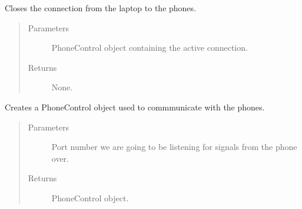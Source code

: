 \documentclass[letterpaper,10pt,english]{sphinxmanual}
\begin{document}
\begin{fulllineitems}
\begin{fulllineitems}
\begin{quote}
\begin{description}
\end{description}\end{quote}

\end{fulllineitems}


\end{fulllineitems}


\begin{fulllineitems}
\label{\detokenize{index:src.Controllers.Program_Controller.close_conn}}
Closes the connection from the laptop to the phones.
\begin{quote}\begin{description}
\item[{Parameters}] \leavevmode
{} \textendash{} PhoneControl object containing the active connection.

\item[{Returns}] \leavevmode
None.

\end{description}\end{quote}

\end{fulllineitems}


\begin{fulllineitems}
\label{\detokenize{index:src.Controllers.Program_Controller.createPhoneConnection}}
Creates a PhoneControl object used to commmunicate with the phones.
\begin{quote}\begin{description}
\item[{Parameters}] \leavevmode
{} \textendash{} Port number we are going to be listening for signals from the phone over.

\item[{Returns}] \leavevmode
PhoneControl object.

\end{description}\end{quote}

\end{fulllineitems}
\end{document}
